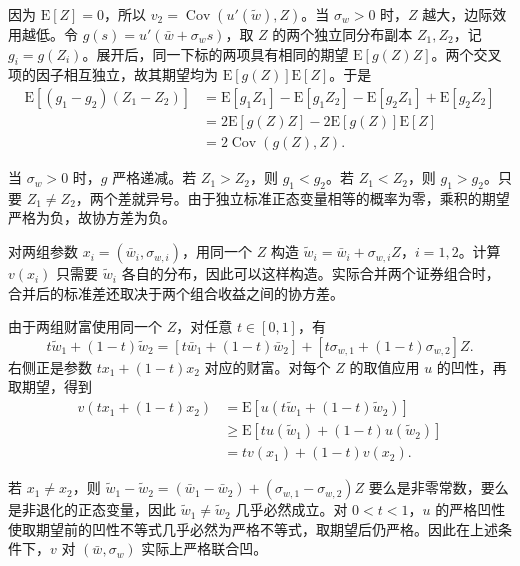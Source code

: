\begin{solution}[label-content={},label-indentation=false,blank-type=none,show-qed=false,label-punct={}]
\begin{tcolorbox}[knowledge,title={\WJRef{thm:wj-twelve-3}{定理~} 第 (2) 项的证明（方法二）}]
因为 $\mathrm E[Z]=0$，所以 $v_2=\operatorname{Cov}(u'(\widetilde w),Z)$。当 $\sigma_w>0$ 时，$Z$ 越大，边际效用越低。令 $g(s)=u'(\bar w+\sigma_w s)$，取 $Z$ 的两个独立同分布副本 $Z_1,Z_2$，记 $g_i=g(Z_i)$。展开后，同一下标的两项具有相同的期望 $\mathrm E[g(Z)Z]$。两个交叉项的因子相互独立，故其期望均为 $\mathrm E[g(Z)]\mathrm E[Z]$。于是
\[
 \begin{aligned}
 \mathrm E[(g_1-g_2)(Z_1-Z_2)]
 &=\mathrm E[g_1Z_1]-\mathrm E[g_1Z_2]
   -\mathrm E[g_2Z_1]+\mathrm E[g_2Z_2]\\
 &=2\mathrm E[g(Z)Z]-2\mathrm E[g(Z)]\mathrm E[Z]\\
 &=2\operatorname{Cov}(g(Z),Z).
 \end{aligned}
\]

当 $\sigma_w>0$ 时，$g$ 严格递减。若 $Z_1>Z_2$，则 $g_1<g_2$。若 $Z_1<Z_2$，则 $g_1>g_2$。只要 $Z_1\ne Z_2$，两个差就异号。由于独立标准正态变量相等的概率为零，乘积的期望严格为负，故协方差为负。
\end{tcolorbox}
\end{solution}

\begin{solution}[label-content={},label-indentation=false,blank-type=none,show-qed=false,label-punct={}]
\begin{tcolorbox}[knowledge,title={\WJRef{thm:wj-twelve-3}{定理~} 第 (5) 项的证明（方法二）}]
对两组参数 $x_i=(\bar w_i,\sigma_{w,i})$，用同一个 $Z$ 构造 $\widetilde w_i=\bar w_i+\sigma_{w,i} Z$，$i=1,2$。计算 $v(x_i)$ 只需要 $\widetilde w_i$ 各自的分布，因此可以这样构造。实际合并两个证券组合时，合并后的标准差还取决于两个组合收益之间的协方差。

由于两组财富使用同一个 $Z$，对任意 $t\in[0,1]$，有
\[
 t\widetilde w_1+(1-t)\widetilde w_2
 =[t\bar w_1+(1-t)\bar w_2]+[t\sigma_{w,1}+(1-t)\sigma_{w,2}]Z.
\]
右侧正是参数 $tx_1+(1-t)x_2$ 对应的财富。对每个 $Z$ 的取值应用 $u$ 的凹性，再取期望，得到
\[
 \begin{aligned}
 v(tx_1+(1-t)x_2)
 &=\mathrm E[u(t\widetilde w_1+(1-t)\widetilde w_2)]\\
 &\ge\mathrm E[t u(\widetilde w_1)+(1-t)u(\widetilde w_2)]\\
 &=t v(x_1)+(1-t)v(x_2).
 \end{aligned}
\]

若 $x_1\ne x_2$，则 $\widetilde w_1-\widetilde w_2=(\bar w_1-\bar w_2)+(\sigma_{w,1}-\sigma_{w,2})Z$ 要么是非零常数，要么是非退化的正态变量，因此 $\widetilde w_1\ne \widetilde w_2$ 几乎必然成立。对 $0<t<1$，$u$ 的严格凹性使取期望前的凹性不等式几乎必然为严格不等式，取期望后仍严格。因此在上述条件下，$v$ 对 $(\bar w,\sigma_w)$ 实际上严格联合凹。
\end{tcolorbox}
\end{solution}

